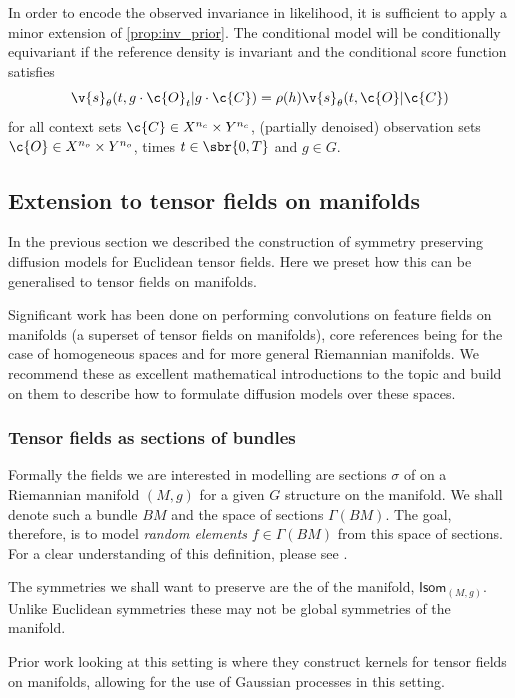 In order to encode the observed invariance in likelihood, it is sufficient to apply a minor extension of \cref{prop:inv_prior}.
The conditional model will be conditionally equivariant if the reference density is invariant and the conditional score function satisfies
\[
	\v{s}_\theta(t, g \cdot \c{O}_t | g \cdot\c{C}) = \rho(h) \v{s}_\theta(t, \c{O} | \c{C})
\] for all context sets \(\c{C}\in X^{n_c}\x Y^{n_c}\), (partially denoised) observation sets \(\c{O}\in X^{n_o}\x Y^{n_o}\), times \(t\in \sbr{0, T}\) and \(g\in G\).

\subsection{Extension to tensor fields on manifolds}
In the previous section we described the construction of symmetry preserving diffusion models for Euclidean tensor fields.
Here we preset how this can be generalised to tensor fields on manifolds.

Significant work has been done on performing convolutions on feature fields on manifolds (a superset of tensor fields on manifolds), core references being \textcite{cohen2021equivariant} for the case of homogeneous spaces and \textcite{weiler2023equivariant} for more general Riemannian manifolds.
We recommend these as excellent mathematical introductions to the topic and build on them to describe how to formulate diffusion models over these spaces.

\subsubsection{Tensor fields as sections of bundles}
Formally the fields we are interested in modelling are sections \(\sigma\) of  on a Riemannian manifold \((M, g)\) for a given \(G\) structure on the manifold.
We shall denote such a bundle \(BM\) and the space of sections \(\Gamma(BM)\).
The goal, therefore, is to model \textit{random elements} \(f\in \Gamma(BM)\) from this space of sections.
For a clear understanding of this definition, please see \textcite[pages 73-95]{weiler2023equivariant}.

The symmetries we shall want to preserve are the  of the manifold, \(\mathsf{Isom}_{(M, g)}\).
Unlike Euclidean symmetries these may not be global symmetries of the manifold.

Prior work looking at this setting is \textcite{hutchinson2021vector} where they construct kernels for tensor fields on manifolds, allowing for the use of Gaussian processes in this setting.

